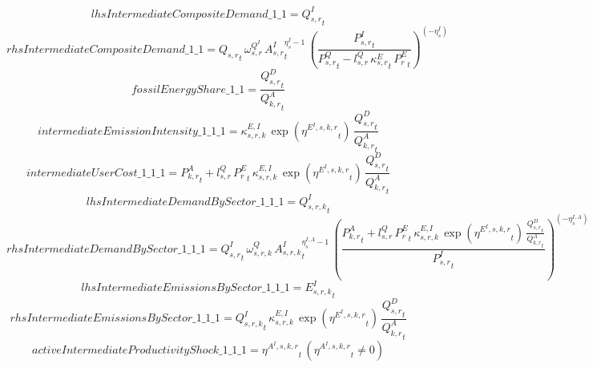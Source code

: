 \begin{dmath*}
lhsIntermediateCompositeDemand\_1\_1 = {{Q^{I}_{s,r}}}_{t}
\end{dmath*}
\begin{dmath*}
rhsIntermediateCompositeDemand\_1\_1 = {{Q_{s,r}}}_{t}\, {{\omega^{Q^{I}}_{s,r}}}\, {{A^{I}_{s,r}}}_{t}^{{{\eta^{I}_{s}}}-1}\, \left(\frac{{{P^{I}_{s,r}}}_{t}}{{{P^Q_{s,r}}}_{t}-{{l^{Q}_{s,r}}}\, {{\kappa^{E}_{s,r}}}_{t}\, {{P^E_r}}_{t}}\right)^{\left(-{{\eta^{I}_{s}}}\right)}
\end{dmath*}
\begin{dmath*}
fossilEnergyShare\_1\_1 = \frac{{{Q^{D}_{s,r}}}_{t}}{{{Q^{A}_{k,r}}}_{t}}
\end{dmath*}
\begin{dmath*}
intermediateEmissionIntensity\_1\_1\_1 = {{\kappa^{E,I}_{s,r,k}}}\, \exp\left({{\eta^{E^{I},s,k,r}}}_{t}\right)\, \frac{{{Q^{D}_{s,r}}}_{t}}{{{Q^{A}_{k,r}}}_{t}}
\end{dmath*}
\begin{dmath*}
intermediateUserCost\_1\_1\_1 = {{P^{A}_{k,r}}}_{t}+{{l^{Q}_{s,r}}}\, {{P^E_r}}_{t}\, {{\kappa^{E,I}_{s,r,k}}}\, \exp\left({{\eta^{E^{I},s,k,r}}}_{t}\right)\, \frac{{{Q^{D}_{s,r}}}_{t}}{{{Q^{A}_{k,r}}}_{t}}
\end{dmath*}
\begin{dmath*}
lhsIntermediateDemandBySector\_1\_1\_1 = {{Q^{I}_{s,r,k}}}_{t}
\end{dmath*}
\begin{dmath*}
rhsIntermediateDemandBySector\_1\_1\_1 = {{Q^{I}_{s,r}}}_{t}\, {{\omega^{Q}_{s,r,k}}}\, {{A^{I}_{s,r,k}}}_{t}^{{{\eta^{I,A}_{s}}}-1}\, \left(\frac{{{P^{A}_{k,r}}}_{t}+{{l^{Q}_{s,r}}}\, {{P^E_r}}_{t}\, {{\kappa^{E,I}_{s,r,k}}}\, \exp\left({{\eta^{E^{I},s,k,r}}}_{t}\right)\, \frac{{{Q^{D}_{s,r}}}_{t}}{{{Q^{A}_{k,r}}}_{t}}}{{{P^{I}_{s,r}}}_{t}}\right)^{\left(-{{\eta^{I,A}_{s}}}\right)}
\end{dmath*}
\begin{dmath*}
lhsIntermediateEmissionsBySector\_1\_1\_1 = {{E^I_{s,r,k}}}_{t}
\end{dmath*}
\begin{dmath*}
rhsIntermediateEmissionsBySector\_1\_1\_1 = {{Q^{I}_{s,r,k}}}_{t}\, {{\kappa^{E,I}_{s,r,k}}}\, \exp\left({{\eta^{E^{I},s,k,r}}}_{t}\right)\, \frac{{{Q^{D}_{s,r}}}_{t}}{{{Q^{A}_{k,r}}}_{t}}
\end{dmath*}
\begin{dmath*}
activeIntermediateProductivityShock\_1\_1\_1 = {{\eta^{A^{I},s,k,r}}}_{t}\, \left({{\eta^{A^{I},s,k,r}}}_{t}\neq 0\right)
\end{dmath*}
